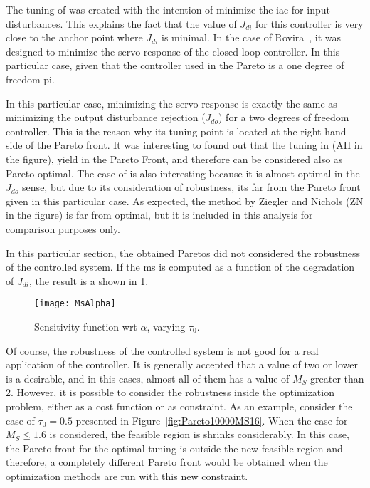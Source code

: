 The tuning of \citet{Murril1967} was created with the intention of minimize the \gls{iae} for input disturbances. This explains the fact that the value of $J_{di}$ for this controller is very close to the anchor point where $J_{di}$ is minimal. In the case of Rovira~\citep{Rovira1969}, it was designed to minimize the servo response of the closed loop controller. In this particular case, given that the controller used in the Pareto is a one degree of freedom \gls{pi}.

In this particular case, minimizing the servo response is exactly the same as minimizing the output disturbance rejection ($J_{do}$) for a two degrees of freedom controller. This is the reason why its tuning point is located at the right hand side of the Pareto front. It was interesting to found out that the tuning in \cite{Astrom1995} (AH in the figure), yield in the Pareto Front, and therefore can be considered also as Pareto optimal. The case of \citet{Grimholt2012} is also interesting because it is almost optimal in the $J_{do}$ sense, but due to its consideration of robustness, its far from the Pareto front given in this particular case. As expected, the method by Ziegler and Nichols \citep{Ziegler1942} (ZN in the figure) is far from optimal, but it is included in this analysis for comparison purposes only.

In this particular section, the obtained Paretos did not considered the robustness of the controlled system. If the \gls{ms} is computed as a function of the degradation of $J_{di}$, the result is a shown in \ref{fig:MsAlpha}.
%
\begin{figure}%
	\centering
	\texttt{[image: MsAlpha]}%
	\caption{Sensitivity function wrt $\alpha$, varying $\tau_0$.}%
	\label{fig:MsAlpha}%
\end{figure}
%

Of course, the robustness of the controlled system is not good for a real application of the controller. It is generally accepted that a value of two or lower is a desirable, and in this cases, almost all of them has a value of $M_S$ greater than 2. However, it is possible to consider the robustness inside the optimization problem, either as a cost function or as constraint. As an example, consider the case of $\tau_0=0.5$ presented in Figure~\ref{fig:Pareto10000MS16}. When the case for $M_S\leq 1.6$ is considered, the feasible region is shrinks considerably. In this case, the Pareto front for the optimal tuning is outside the new feasible region and therefore, a completely different Pareto front would be obtained when the optimization methods are run with this new constraint.

